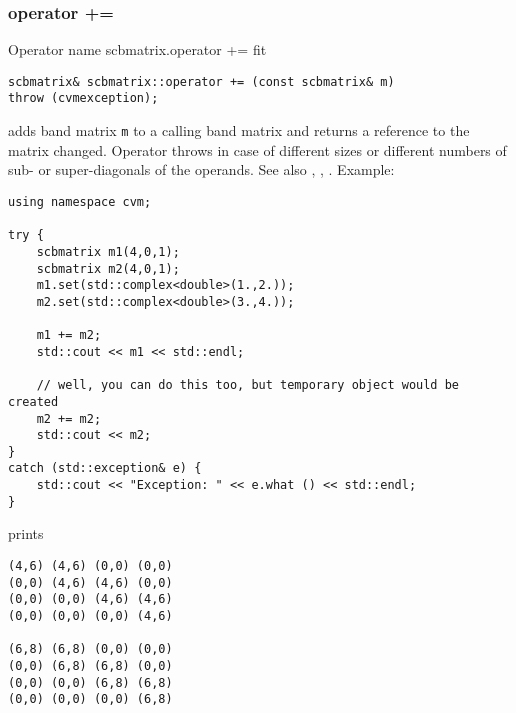 \subsubsection{operator +=}
Operator%
\pdfdest name {scbmatrix.operator +=} fit
\begin{verbatim}
scbmatrix& scbmatrix::operator += (const scbmatrix& m) 
throw (cvmexception);
\end{verbatim}
adds  band matrix \verb"m" to a calling band matrix 
and returns a reference to
the matrix changed.
Operator throws  
in case of different sizes or different numbers of sub- or super-diagonals
of the operands.
See also ,
,
.
Example:
\begin{Verbatim}
using namespace cvm;

try {
    scbmatrix m1(4,0,1);
    scbmatrix m2(4,0,1);
    m1.set(std::complex<double>(1.,2.));
    m2.set(std::complex<double>(3.,4.));

    m1 += m2;
    std::cout << m1 << std::endl;

    // well, you can do this too, but temporary object would be created
    m2 += m2; 
    std::cout << m2;
}
catch (std::exception& e) {
    std::cout << "Exception: " << e.what () << std::endl;
}
\end{Verbatim}
prints
\begin{Verbatim}
(4,6) (4,6) (0,0) (0,0)
(0,0) (4,6) (4,6) (0,0)
(0,0) (0,0) (4,6) (4,6)
(0,0) (0,0) (0,0) (4,6)

(6,8) (6,8) (0,0) (0,0)
(0,0) (6,8) (6,8) (0,0)
(0,0) (0,0) (6,8) (6,8)
(0,0) (0,0) (0,0) (6,8)
\end{Verbatim}
\newpage




